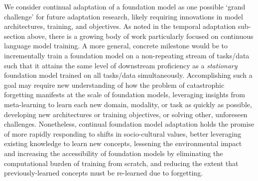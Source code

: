 We consider continual adaptation of a foundation model as one possible `grand challenge' for future adaptation research, likely requiring innovations in model architectures, training, and objectives. As noted in the temporal adaptation sub-section above, there is a growing body of work particularly focused on continuous language model training. A more general, concrete milestone would be to incrementally train a foundation model on a non-repeating stream of tasks/data such that it attains the same level of downstream proficiency as a \textit{stationary} foundation model trained on all tasks/data simultaneously. 
Accomplishing such a goal may require new understanding of how the problem of catastrophic forgetting manifests at the scale of foundation models, leveraging insights from meta-learning \cite{schmidhuber1987evolutionary,santoro2016meta,finn2017modelagnostic} to learn each new domain, modality, or task as quickly as possible, developing new architectures or training objectives, or solving other, unforeseen challenges. Nonetheless, continual foundation model adaptation holds the promise of more rapidly responding to shifts in socio-cultural values, better leveraging existing knowledge to learn new concepts, lessening the environmental impact and increasing the accessibility of foundation models by eliminating the computational burden of training from scratch, and reducing the extent that previously-learned concepts must be re-learned due to forgetting.
